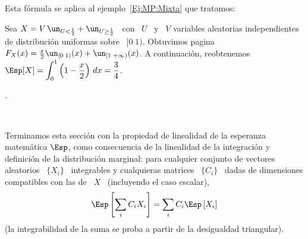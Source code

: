 Esta f\'ormula se aplica al ejemplo~\ref{Ej:MP:Mixta} que tratamos:
%
\begin{ejemplo}
\label{Ej:MP:EspMixtaPositiva}
%
Sea $X =  V \, \un_{U <  \frac12} + \un_{U \ge \frac12}$  \ con \ $U$ \  y \ $V$
variables aleatorias  independientes de distribuci\'on uniformas sobre  \ $[0 \;
1)$.  Obtuvimos pagina~\pageref{Ej:MP:Mixta} \  $F_X(x) = \frac{x}{2} \un_{[0 \;
  1)}(x)  +   \un_{[1  \;   +\infty)}(x)$.   A  continuaci\'on,   reobtenemos  \
$\displaystyle  \Esp[X]  = \int_0^1  \left(  1 -  \frac{x}{2}  \right)  \, dx  =
\frac34$.
\end{ejemplo}.

\

Terminamos  esta  secci\'on con  la  propiedad  de  linealidad de  la  esperanza
matem\'atica $\Esp$,  como consecuencia de  la linealidad de la  integraci\'on y
definici\'on de la distribuci\'on  marginal: para cualquier conjunto de vectores
aleatorios \ $\{  X_i \}$ \ integrables  y cualquieras matrices \ $\{  C_i \}$ \
dadas  de  dimensiones compatibles  con  las  de \  $X$  \  (incluyendo el  caso
escalar),
%
\[
\Esp\left[ \sum_i C_i X_i \right] = \sum_i C_i \Esp\left[ X_i \right]
\]
%
(la integrabilidad de la suma se proba a partir de la desigualdad triangular).




\label{Ssec:MP:Momentos}

